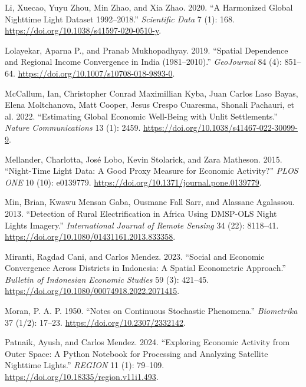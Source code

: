 \documentclass[
  letterpaper,
  DIV=11,
  numbers=noendperiod]{scrartcl}
\newlength{\cslhangindent}
\newenvironment{CSLReferences}[2] %
 {\begin{list}{}{%
  \setlength{\itemindent}{0pt}
  \setlength{\leftmargin}{0pt}
  \setlength{\parsep}{0pt}
  \ifodd #1
   \setlength{\leftmargin}{\cslhangindent}
   \setlength{\itemindent}{-1\cslhangindent}
  \fi
  \setlength{\itemsep}{#2\baselineskip}}}
 {\end{list}}
\begin{document}
\begin{CSLReferences}{1}{0}
Li, Xuecao, Yuyu Zhou, Min Zhao, and Xia Zhao. 2020. {``A Harmonized
Global Nighttime Light Dataset 1992--2018.''} \emph{Scientific Data} 7
(1): 168. \url{https://doi.org/10.1038/s41597-020-0510-y}.

Lolayekar, Aparna P., and Pranab Mukhopadhyay. 2019. {``Spatial
Dependence and Regional Income Convergence in {India} (1981--2010).''}
\emph{GeoJournal} 84 (4): 851--64.
\url{https://doi.org/10.1007/s10708-018-9893-0}.

McCallum, Ian, Christopher Conrad Maximillian Kyba, Juan Carlos Laso
Bayas, Elena Moltchanova, Matt Cooper, Jesus Crespo Cuaresma, Shonali
Pachauri, et al. 2022. {``Estimating Global Economic Well-Being with
Unlit Settlements.''} \emph{Nature Communications} 13 (1): 2459.
\url{https://doi.org/10.1038/s41467-022-30099-9}.

Mellander, Charlotta, José Lobo, Kevin Stolarick, and Zara Matheson.
2015. {``Night-Time Light Data: A Good Proxy Measure for Economic
Activity?''} \emph{PLOS ONE} 10 (10): e0139779.
\url{https://doi.org/10.1371/journal.pone.0139779}.

Min, Brian, Kwawu Mensan Gaba, Ousmane Fall Sarr, and Alassane
Agalassou. 2013. {``Detection of Rural Electrification in {Africa} Using
{DMSP-OLS} Night Lights Imagery.''} \emph{International Journal of
Remote Sensing} 34 (22): 8118--41.
\url{https://doi.org/10.1080/01431161.2013.833358}.

Miranti, Ragdad Cani, and Carlos Mendez. 2023. {``Social and Economic
Convergence Across Districts in {Indonesia}: {A} Spatial Econometric
Approach.''} \emph{Bulletin of Indonesian Economic Studies} 59 (3):
421--45. \url{https://doi.org/10.1080/00074918.2022.2071415}.

Moran, P. A. P. 1950. {``Notes on Continuous Stochastic Phenomena.''}
\emph{Biometrika} 37 (1/2): 17--23.
\url{https://doi.org/10.2307/2332142}.

Patnaik, Ayush, and Carlos Mendez. 2024. {``Exploring Economic Activity
from Outer Space: A {Python} Notebook for Processing and Analyzing
Satellite Nighttime Lights.''} \emph{REGION} 11 (1): 79--109.
\url{https://doi.org/10.18335/region.v11i1.493}.


\end{CSLReferences}
\end{document}
